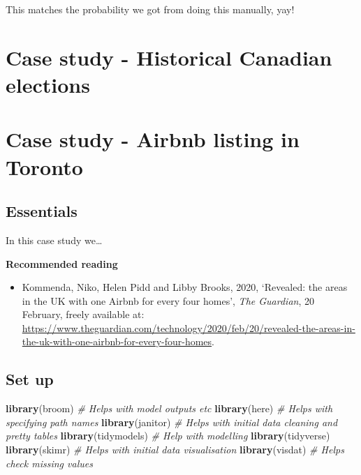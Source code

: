 \documentclass[
]{book}
\newenvironment{Shaded}{\begin{snugshade}}{\end{snugshade}}
\newcommand{\CommentTok}[1]{\textcolor[rgb]{0.56,0.35,0.01}{\textit{#1}}}
\newcommand{\KeywordTok}[1]{\textcolor[rgb]{0.13,0.29,0.53}{\textbf{#1}}}
\newcommand{\NormalTok}[1]{#1}
\providecommand{\tightlist}{%
  \setlength{\itemsep}{0pt}\setlength{\parskip}{0pt}}
\begin{document}
This matches the probability we got from doing this manually, yay!

\hypertarget{case-study---historical-canadian-elections}{%
\section{Case study - Historical Canadian elections}\label{case-study---historical-canadian-elections}}

\hypertarget{case-study---airbnb-listing-in-toronto}{%
\section{Case study - Airbnb listing in Toronto}\label{case-study---airbnb-listing-in-toronto}}

\hypertarget{essentials}{%
\subsection{Essentials}\label{essentials}}

In this case study we\ldots{}

\textbf{Recommended reading}

\begin{itemize}
\tightlist
\item
  Kommenda, Niko, Helen Pidd and Libby Brooks, 2020, `Revealed: the areas in the UK with one Airbnb for every four homes', \emph{The Guardian}, 20 February, freely available at: \url{https://www.theguardian.com/technology/2020/feb/20/revealed-the-areas-in-the-uk-with-one-airbnb-for-every-four-homes}.
\end{itemize}

\hypertarget{set-up-1}{%
\subsection{Set up}\label{set-up-1}}

\begin{Shaded}
\begin{Highlighting}[]
\KeywordTok{library}\NormalTok{(broom) }\CommentTok{# Helps with model outputs etc}
\KeywordTok{library}\NormalTok{(here) }\CommentTok{# Helps with specifying path names}
\KeywordTok{library}\NormalTok{(janitor) }\CommentTok{# Helps with initial data cleaning and pretty tables}
\KeywordTok{library}\NormalTok{(tidymodels) }\CommentTok{# Help with modelling}
\KeywordTok{library}\NormalTok{(tidyverse) }
\KeywordTok{library}\NormalTok{(skimr) }\CommentTok{# Helps with initial data visualisation}
\KeywordTok{library}\NormalTok{(visdat) }\CommentTok{# Helps check missing values}
\end{Highlighting}
\end{Shaded}
\end{document}
